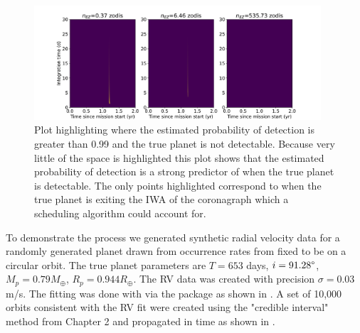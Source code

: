 \begin{figure}
  \begin{center}
    \includegraphics[width=0.95\textwidth]{ch3/figures/pdet_colored_true_err.pdf}
  \end{center}
  \caption{Plot highlighting where the estimated probability of detection is greater
  than 0.99 and the true planet is not detectable. Because very little of the space
  is highlighted this plot shows that the estimated probability of detection is a
  strong predictor of when the true planet is detectable. The only points highlighted
  correspond to when the true planet is exiting the IWA of the coronagraph which a
  scheduling algorithm could account for.}
  \label{fig:pdet_colored_true_err}
\end{figure}


To demonstrate the process we generated synthetic radial velocity data for a
randomly generated planet drawn from occurrence rates from
\citet{dulzJointRadialVelocity2020} fixed to be on a circular orbit. The true
planet parameters are $T=653$ days, $i=91.28\degree$, $M_p=0.79 M_\oplus$, $R_p
= 0.944 R_\oplus$. The RV data was created with precision $\sigma=0.03$ m/s.
The fitting was done with  \citep{fultonRadvelRadialVelocity2018}
via the  package \citep{rosenthalCaliforniaLegacy2021} as shown in . A set of 10,000 orbits consistent with the RV
fit were created using the "credible interval" method from Chapter 2 and
propagated in time as shown in .

